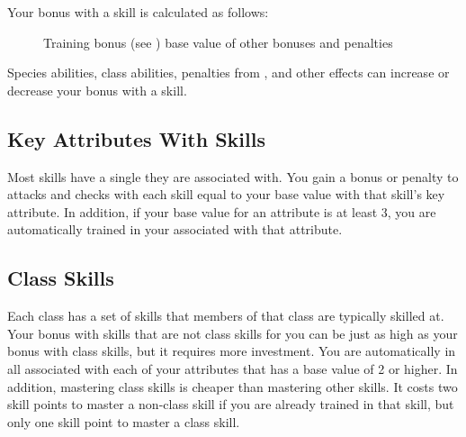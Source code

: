         Your bonus with a skill is calculated as follows:

        \begin{figure}[h]
            \centering Training bonus (see ) \add base value of  \add other bonuses and penalties
        \end{figure}

         Species abilities, class abilities, penalties from , and other effects can increase or decrease your bonus with a skill.

    \subsection{Key Attributes With Skills}\label{Key Attributes With Skills}
        Most skills have a single  they are associated with.
        You gain a bonus or penalty to attacks and checks with each skill equal to your base value with that skill's key attribute.
        In addition, if your base value for an attribute is at least 3, you are automatically trained in your  associated with that attribute.

    \subsection{Class Skills}\label{Class Skills}
        Each class has a set of skills that members of that class are typically skilled at.
        Your bonus with skills that are not class skills for you can be just as high as your bonus with class skills, but it requires more investment.
        You are automatically  in all  associated with each of your attributes that has a base value of 2 or higher.
        In addition, mastering class skills is cheaper than mastering other skills.
        It costs two skill points to master a non-class skill if you are already trained in that skill, but only one skill point to master a class skill.


